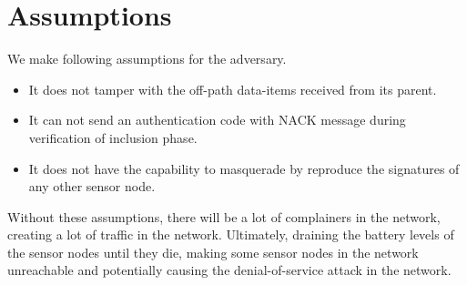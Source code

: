 	\section{Assumptions}
	We make following assumptions for the adversary.
		\begin{itemize}
			\item It does not tamper with the off-path data-items received from its parent.
			\item It can not send an authentication code with NACK message during verification of inclusion phase.
			\item It does not have the capability to masquerade by reproduce the signatures of any other sensor node.
		\end{itemize}
	Without these assumptions, there will be a lot of complainers in the network, creating a lot of traffic in the network.
	Ultimately, draining the battery levels of the sensor nodes until they die, making some sensor nodes in the network unreachable and potentially causing the denial-of-service attack in the network.

